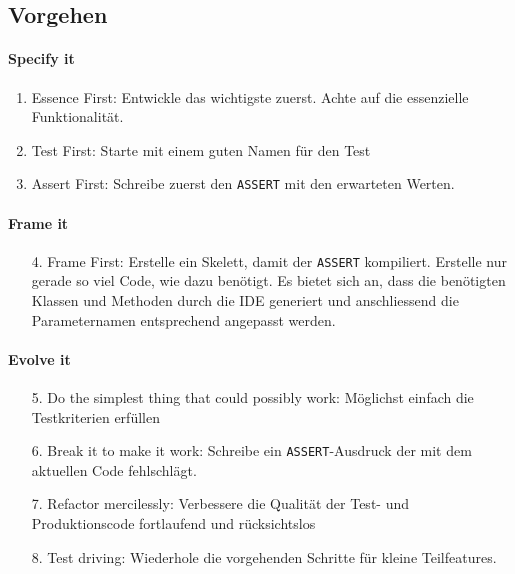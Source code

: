 \clearpage

\subsection{Vorgehen}
\paragraph{Specify it}
\begin{enumerate}
	\item Essence First: Entwickle das wichtigste zuerst. Achte auf die essenzielle Funktionalität.
	\item Test First: Starte mit einem guten Namen für den Test
	\item Assert First: Schreibe zuerst den \lstinline|ASSERT| mit den erwarteten Werten.
\end{enumerate}

\paragraph{Frame it}
\begin{enumerate}
	\item[4.] Frame First: Erstelle ein Skelett, damit der \lstinline|ASSERT| kompiliert. Erstelle nur gerade so viel Code, wie dazu benötigt. Es bietet sich an, dass die benötigten Klassen und Methoden durch die IDE generiert und anschliessend die Parameternamen entsprechend angepasst werden.
\end{enumerate}

\paragraph{Evolve it}
\begin{enumerate}
	\item[5.] Do the simplest thing that could possibly work: Möglichst einfach die Testkriterien erfüllen
	\item[6.] Break it to make it work: Schreibe ein \lstinline|ASSERT|-Ausdruck der mit dem aktuellen Code fehlschlägt.
	\item[7.] Refactor mercilessly: Verbessere die Qualität der Test- und Produktionscode fortlaufend und rücksichtslos
	\item[8.] Test driving: Wiederhole die vorgehenden Schritte für kleine Teilfeatures.
\end{enumerate}

